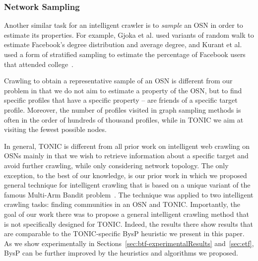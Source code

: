 \documentclass[journal]{IEEEtran}
\begin{document}
%


\subsubsection{Network Sampling}

Another similar task for an intelligent crawler is to {\em sample} an OSN in order to estimate its properties. 
For example, Gjoka et al. used variants of random walk to estimate Facebook's degree distribution and average degree\cite{gojka2010walkingInFacebook}, and Kurant et al. used a form of stratified sampling to estimate the percentage of Facebook users that attended college~\cite{kurant2011walkingOn}. 

Crawling to obtain a representative sample of an OSN is different from our problem in that we do not aim to estimate a property of the OSN, but to find specific profiles that have a specific property -- are friends of a specific target profile. Moreover, the number of profiles visited in graph sampling methods is often in the order of hundreds of thousand profiles, while in  TONIC we aim at visiting the fewest possible nodes. 


In general, TONIC is different from all prior work on intelligent web crawling on OSNs mainly in that we wish to retrieve information about a specific target and avoid further crawling, while only considering network topology. The only exception, to the best of our knowledge, is our prior work in which we proposed general technique for intelligent crawling that is based on a unique variant of the famous Multi-Arm Bandit problem~\cite{bnaya2013social-journal}. The technique was applied to two intelligent crawling tasks: finding communities in an OSN and TONIC. Importantly, the goal of our work there was to propose a general intelligent crawling method that is not specifically designed for TONIC. Indeed, the results there show results that are comparable to the TONIC-specific BysP heuristic we present in this paper. As we show experimentally in Sections~\ref{sec:btf-experimentalResults} and~\ref{sec:etf}, BysP can be further improved by the heuristics and algorithms we proposed. 
\end{document}
